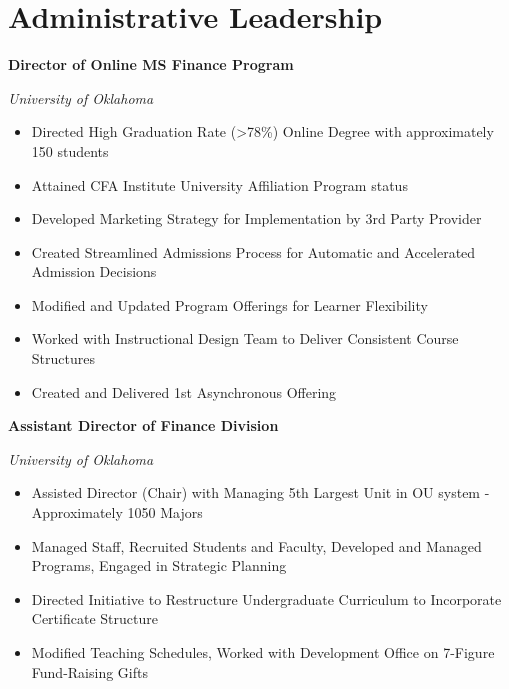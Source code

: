 \documentclass[11pt,a4paper,]{awesome-cv}
\begin{document}
\makecvheader





\section{Administrative Leadership}\label{administrative-leadership}

\textbf{Director of Online MS Finance Program}

\textit{University of Oklahoma}

\begin{itemize}
\item Directed High Graduation Rate (>78\%) Online Degree with approximately 150 students
\item Attained CFA Institute University Affiliation Program status
\item Developed Marketing Strategy for Implementation by 3rd Party Provider
\item Created Streamlined Admissions Process for Automatic and Accelerated Admission Decisions
\item Modified and Updated Program Offerings for Learner Flexibility
\item Worked with Instructional Design Team to Deliver Consistent Course Structures
\item Created and Delivered 1st Asynchronous Offering
\end{itemize}

\textbf{Assistant Director of Finance Division}

\textit{University of Oklahoma}

\begin{itemize}
\item Assisted Director (Chair) with Managing 5th Largest Unit in OU system - Approximately 1050 Majors
\item Managed Staff, Recruited Students and Faculty, Developed and Managed Programs, Engaged in Strategic Planning
\item Directed Initiative to Restructure Undergraduate Curriculum to Incorporate Certificate Structure
\item Modified Teaching Schedules, Worked with Development Office on 7-Figure Fund-Raising Gifts
\end{itemize}
\end{document}
